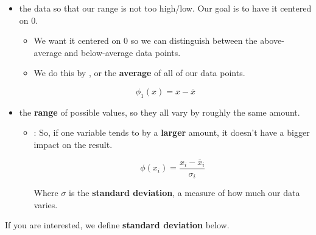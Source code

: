                 \begin{itemize}
                    \item {} the data so that our range is not too high/low. Our goal is to have it centered on 0.
                        \begin{itemize}
                            \item We want it centered on 0 so we can distinguish between the above-average and below-average data points.
                                
                            \item We do this by , or the \textbf{average} of all of our data points.
                        \end{itemize}
                        
                    \begin{equation}
                        \phi_1(x) = x - \overline{x}
                    \end{equation}

                    \item {} the \textbf{range} of possible values, so they all vary by roughly the same amount.

                    \begin{itemize}
                        \item: So, if one variable tends to  by a \textbf{larger} amount, it doesn't have a bigger impact on the result.

                        \begin{equation}
                            \phi(x_i) = \frac{x_i - \overline{x}_i}{\sigma_i}
                        \end{equation}
    
                        Where $\sigma$ is the \textbf{standard deviation}, a measure of how much our data varies.
                    \end{itemize}
                    
                    
                \end{itemize}

                If you are interested, we define \textbf{standard deviation} below.\\

